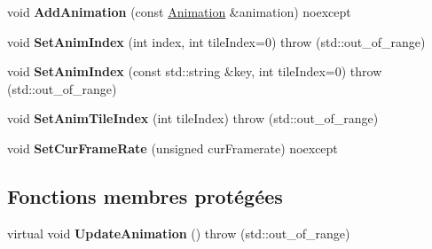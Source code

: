 \begin{DoxyCompactItemize}
void {\bfseries Add\+Animation} (const \hyperlink{structmy_1_1AnimatedObject_1_1Animation}{Animation} \&animation) noexcept
\item 
\mbox{\label{classmy_1_1AnimatedObject_a4efb6bb97d338e7008c84800ab7c3802}} 
void {\bfseries Set\+Anim\+Index} (int index, int tile\+Index=0)  throw (std\+::out\+\_\+of\+\_\+range)
\item 
\mbox{\label{classmy_1_1AnimatedObject_ab48589255e1825b37c68b25522de2b94}} 
void {\bfseries Set\+Anim\+Index} (const std\+::string \&key, int tile\+Index=0)  throw (std\+::out\+\_\+of\+\_\+range)
\item 
\mbox{\label{classmy_1_1AnimatedObject_aa4e740cdea42f3531264a3b438d7482d}} 
void {\bfseries Set\+Anim\+Tile\+Index} (int tile\+Index)  throw (std\+::out\+\_\+of\+\_\+range)
\item 
\mbox{\label{classmy_1_1AnimatedObject_a6c79b593a1fec85a831ec94a38f94c83}} 
void {\bfseries Set\+Cur\+Frame\+Rate} (unsigned cur\+Framerate) noexcept
\end{DoxyCompactItemize}
\subsection*{Fonctions membres protégées}
\begin{DoxyCompactItemize}
\item 
\mbox{\label{classmy_1_1AnimatedObject_a3191de9eb8f6cff2f5392638fa13cca3}} 
virtual void {\bfseries Update\+Animation} ()  throw (std\+::out\+\_\+of\+\_\+range)
\end{DoxyCompactItemize}
